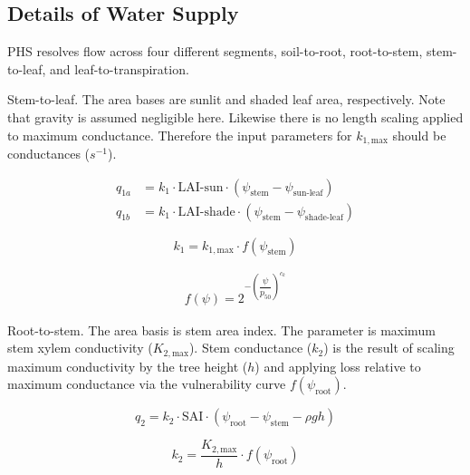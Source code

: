 \documentclass[draft,linenumbers]{agujournal}
\begin{document}
\subsection{Details of Water Supply}

PHS resolves flow across four different segments, soil-to-root, root-to-stem, stem-to-leaf, and leaf-to-transpiration.

Stem-to-leaf. The area bases are sunlit and shaded leaf area, respectively. 
Note that gravity is assumed negligible here. 
Likewise there is no length scaling applied to maximum conductance. 
Therefore the input parameters for $k_{1,\text{max}}$ should be conductances ($s^{-1}$).

\begin{linenomath*} \begin{equation} \begin{aligned}
q_{1a} &= k_{1} \cdot \text{LAI-sun}  \cdot \left( \psi_{\text{stem}}-\psi_{\text{sun-leaf}}\right) \\
q_{1b} &= k_{1} \cdot \text{LAI-shade} \cdot  \left( \psi_{\text{stem}}-\psi_{\text{shade-leaf}}\right)
\end{aligned} \end{equation} \end{linenomath*}

\begin{linenomath*} \begin{equation}
k_{1} = k_{1,\text{max}} \cdot f\left(\psi_{\text{stem}}\right)
\end{equation} \end{linenomath*}

\begin{linenomath*} \begin{equation} \begin{aligned}
f\left(\psi\right)=2^{-\left(\dfrac{\psi}{p_{50}}\right)^{c_k}}
\end{aligned} \end{equation} \end{linenomath*}

Root-to-stem. The area basis is stem area index. 
The parameter is maximum stem xylem conductivity ($K_{2,\text{max}}$).
Stem conductance ($k_2$) is the result of scaling maximum conductivity by the tree height ($h$)
and applying loss relative to maximum conductance via the vulnerability curve $f\left(\psi_{\text{root}}\right)$. 
\begin{linenomath*} \begin{equation}
q_2 = k_2 \cdot  \text{SAI}  \cdot \left( \psi_{\text{root}}-\psi_{\text{stem}}-\rho g h\right)
\end{equation} \end{linenomath*}
\begin{linenomath*} \begin{equation}
k_2 = \dfrac{K_{2,\text{max}}}{h} \cdot f\left(\psi_{\text{root}}\right)
\end{equation} \end{linenomath*}
\end{document}
